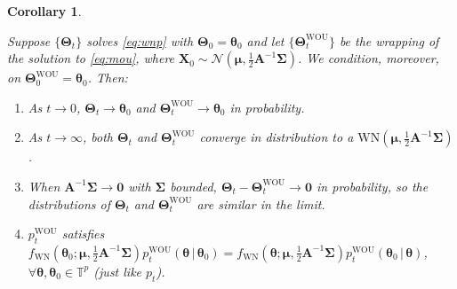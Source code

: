 \documentclass[oneside,11pt]{article}
\newcommand{\T}{\mathbb{T}}
\newcommand{\bX}{\mathbf{X}}
\newcommand{\bmu}{\boldsymbol\mu}
\newcommand{\btheta}{\boldsymbol\theta}
\newcommand{\bTheta}{\boldsymbol\Theta}
\newcommand{\bSigma}{\boldsymbol\Sigma}
\newcommand{\bA}{\mathbf{A}}
\newtheorem{coro}{Corollary}
\begin{document}
\begin{coro}
\label{coro:wou}
{\em Suppose $\{\bTheta_t\}$ solves \eqref{eq:wnp} with $\bTheta_0 =
  \btheta_0$ and let $\{\bTheta^\mathrm{WOU}_t\}$ be the wrapping of the
solution to \eqref{eq:mou}, where $\bX_0\sim\mathcal{N}(\bmu,\frac{1}{2}\bA^{-1}\bSigma)$. We condition, moreover, on $\bTheta^\mathrm{WOU}_0 =
\btheta_0$. Then:
\begin{enumerate}[label=\textit{\roman*.}, ref=\textit{\roman*}]
\item As $t \rightarrow 0$, $\bTheta_t\rightarrow\btheta_0$ and $\bTheta^\mathrm{WOU}_t\rightarrow\btheta_0$ in probability.
\item As $t \rightarrow \infty$, both $\bTheta_t$ and $\bTheta^\mathrm{WOU}_t$
  converge in distribution to a
  $\mathrm{WN}(\bmu,\tfrac{1}{2}\bA^{-1}\bSigma)$.
\item When $\bA^{-1}\bSigma \rightarrow \mathbf{0}$ with $\bSigma$ bounded,
$\bTheta_t - \bTheta^\mathrm{WOU}_t \rightarrow \mathbf{0}$ in probability, so the
distributions of $\bTheta_t$ and $\bTheta^\mathrm{WOU}_t$ are similar in the limit.
\item $p_t^\mathrm{WOU}$ satisfies
$f_{\mathrm{WN}}(\btheta_0;\bmu,\tfrac{1}{2}\bA^{-1}\bSigma)
p^\mathrm{WOU}_t(\btheta\,|\,\btheta_0) =
f_{\mathrm{WN}}(\btheta;\bmu,\tfrac{1}{2}\bA^{-1}\bSigma)
p^\mathrm{WOU}_t(\btheta_0\,|\,\btheta)$,
$\forall \btheta,\btheta_0\in\T^p$ (just like $p_t$).
\end{enumerate}}
\end{coro}
\end{document}
